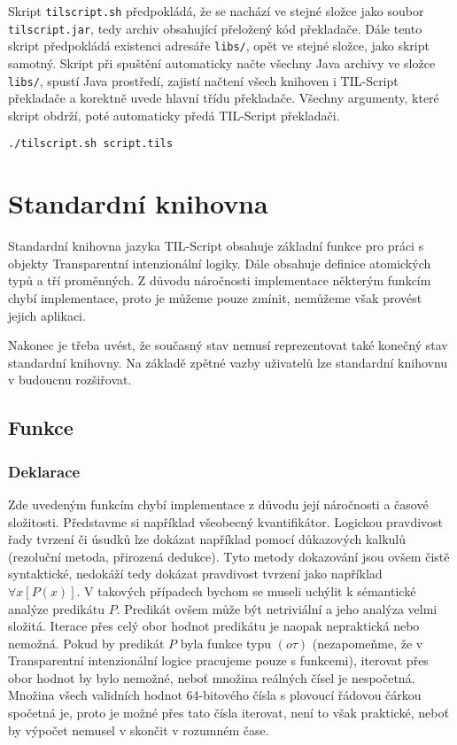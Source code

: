 Skript \lstinline{tilscript.sh} předpokládá, že se nachází ve stejné složce jako soubor
\lstinline{tilscript.jar}, tedy archiv obsahující přeložený kód překladače. Dále tento skript
předpokládá existenci adresáře \lstinline{libs/}, opět ve stejné složce, jako skript samotný.
Skript při spuštění automaticky načte všechny Java archivy ve složce \lstinline{libs/}, spustí
Java prostředí, zajistí načtení všech knihoven i TIL-Script překladače a korektně uvede hlavní
třídu překladače. Všechny argumenty, které skript obdrží, poté automaticky předá TIL-Script
překladači.

\begin{lstlisting}[caption={Spuštění překladače za využití pomocného skriptu}]
./tilscript.sh script.tils
\end{lstlisting}

\section{Standardní knihovna}

Standardní knihovna jazyka TIL-Script obsahuje základní funkce pro práci s objekty Transparentní
intenzionální logiky. Dále obsahuje definice atomických typů a tří proměnných. Z důvodu náročnosti
implementace některým funkcím chybí implementace, proto je můžeme pouze zmínit, nemůžeme však
provést jejich aplikaci.

Nakonec je třeba uvést, že současný stav nemusí reprezentovat také konečný stav standardní knihovny.
Na základě zpětné vazby uživatelů lze standardní knihovnu v budoucnu rozšiřovat.

\subsection{Funkce}

\subsubsection{Deklarace}

Zde uvedeným funkcím chybí implementace z důvodu její náročnosti a časové složitosti. Představme si
například všeobecný kvantifikátor. Logickou pravdivost řady tvrzení či úsudků lze dokázat například
pomocí důkazových kalkulů (rezoluční metoda, přirozená dedukce). Tyto metody dokazování jsou ovšem
čistě syntaktické, nedokáží tedy dokázat pravdivost tvrzení jako například $\forall x[P(x)]$. V takových
případech bychom se museli uchýlit k sémantické analýze predikátu $P$.
Predikát ovšem může být netriviální a jeho analýza velmi složitá. Iterace přes celý obor hodnot
predikátu je naopak nepraktická nebo nemožná. Pokud by predikát $P$ byla funkce typu $(o\tau)$
(nezapomeňme, že v Transparentní intenzionální logice pracujeme pouze s funkcemi), iterovat přes
obor hodnot by bylo nemožné, neboť množina reálných čísel je nespočetná. Množina všech validních
hodnot 64-bitového čísla s plovoucí řádovou čárkou spočetná je, proto je možné přes tato čísla
iterovat, není to však praktické, neboť by výpočet nemusel v skončit v rozumném čase.

